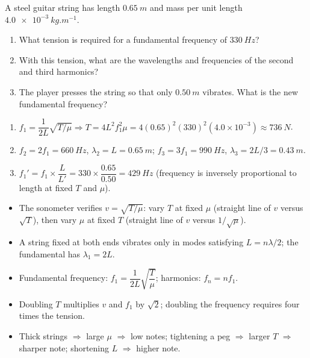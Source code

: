 \documentclass[11pt]{article}
\newcommand{\cle}[1]{{\popxbold\color{popdark}#1}}
\begin{document}
\begin{exercice}
A steel guitar string has length $\SI{0.65}{m}$ and mass per unit length $\SI{4.0e-3}{kg.m^{-1}}$.
\begin{enumerate}
\item What tension is required for a fundamental frequency of $\SI{330}{Hz}$?
\item With this tension, what are the wavelengths and frequencies of the second and third harmonics?
\item The player presses the string so that only $\SI{0.50}{m}$ vibrates. What is the new fundamental frequency?
\end{enumerate}
\end{exercice}

\begin{corrige}[Exercise 1]
\begin{enumerate}
\item $f_1 = \dfrac{1}{2L}\sqrt{T/\mu} \Rightarrow T = 4L^{2}f_1^{2}\mu = 4(0.65)^2(330)^2(4.0\times10^{-3}) \approx \SI{736}{N}$.
\item $f_2 = 2f_1 = \SI{660}{Hz}$, $\lambda_2 = L = \SI{0.65}{m}$; $f_3 = 3f_1 = \SI{990}{Hz}$, $\lambda_3 = 2L/3 = \SI{0.43}{m}$.
\item $f_1' = f_1 \times \dfrac{L}{L'} = 330 \times \dfrac{0.65}{0.50} = \SI{429}{Hz}$ (frequency is inversely proportional to length at fixed $T$ and $\mu$).
\end{enumerate}
\end{corrige}

\begin{aretenir}
\begin{itemize}
\item The \cle{sonometer} verifies $v = \sqrt{T/\mu}$: vary $T$ at fixed $\mu$ (straight line of $v$ versus $\sqrt{T}$), then vary $\mu$ at fixed $T$ (straight line of $v$ versus $1/\sqrt{\mu}$).
\item A string fixed at both ends vibrates only in modes satisfying $L = n\lambda/2$; the fundamental has $\lambda_1 = 2L$.
\item Fundamental frequency: $f_1 = \dfrac{1}{2L}\sqrt{\dfrac{T}{\mu}}$; harmonics: $f_n = nf_1$.
\item Doubling $T$ multiplies $v$ and $f_1$ by $\sqrt{2}$; doubling the frequency requires four times the tension.
\item Thick strings $\Rightarrow$ large $\mu$ $\Rightarrow$ low notes; tightening a peg $\Rightarrow$ larger $T$ $\Rightarrow$ sharper note; shortening $L$ $\Rightarrow$ higher note.
\end{itemize}
\end{aretenir}
\end{document}
